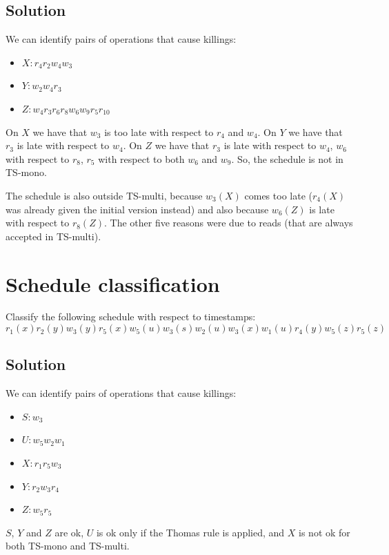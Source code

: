 \documentclass[12pt, a4paper]{report}
\begin{document}
    \subsection*{Solution}
        We can identify pairs of operations that cause killings:
        \begin{itemize}
            \item $X: r_4 r_2 w_4 w_3$
            \item $Y: w_2 w_4 r_3$
            \item $Z: w_4 r_3 r_6 r_8 w_6 w_9 r_5 r_{10}$
        \end{itemize}
        On $X$ we have that $w_3$ is too late with respect to $r_4$ and $w_4$. On $Y$ we have that $r_3$ is late with respect to $w_4$. On 
        $Z$ we have that $r_3$ is late with respect to $w_4$, $w_6$ with respect to $r_8$, $r_5$ with respect to both $w_6$ and $w_9$. 
        So, the schedule is not in TS-mono. 

        The schedule is also outside TS-multi, because $w_3(X)$ comes too late ($r_4(X)$ was already given the initial version instead) and 
        also because $w_6(Z)$ is late with respect to $r_8(Z)$. The other five reasons were due to reads (that are always accepted in TS-multi).

    \newpage

    \section{Schedule classification}
        Classify the following schedule with respect to timestamps: 
        \[r_1(x) r_2(y) w_3(y) r_5(x) w_5(u) w_3(s) w_2(u) w_3(x) w_1(u) r_4(y) w_5(z) r_5(z)\]
    \subsection*{Solution}
        We can identify pairs of operations that cause killings:
        \begin{itemize}
            \item $S:w_3$
            \item $U:w_5w_2w_1$
            \item $X:r_1r_5w_3$
            \item $Y:r_2w_3r_4$
            \item $Z:w_5r_5$
        \end{itemize}
        $S$, $Y$ and $Z$ are ok, $U$ is ok only if the Thomas rule is applied, and $X$ is not ok for both TS-mono and TS-multi. 
\end{document}
